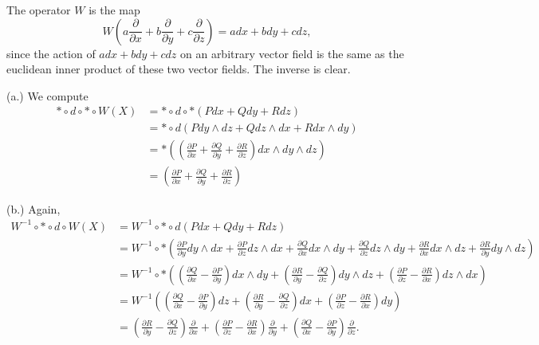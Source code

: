\documentclass[11pt, reqno]{article}
\theoremstyle{plain}
\theoremstyle{definition}
\theoremstyle{remark}
\begin{document}
\begin{enumerate}
    The operator $W$ is the map
    \[
        W(a \frac{\partial}{\partial x} + b \frac{\partial}{\partial y} + c \frac{\partial}{\partial z}) = a dx + b dy + c dz,
    \]
    since the action of $a dx + b dy + c dz$ on an arbitrary vector field is the same as the euclidean inner product of these
    two vector fields. The inverse is clear.

    (a.) We compute 
    \begin{align*}
        * \circ d \circ * \circ W(X) & = * \circ d \circ *(P dx + Q dy + R dz)\\
        &= *\circ d(P dy  \wedge dz + Q dz \wedge dx + R dx \wedge dy)\\
        &= *\left(\left(\frac{\partial P}{\partial x} + \frac{\partial Q}{\partial y} + \frac{\partial R}{\partial z}\right)dx \wedge dy \wedge dz\right)\\
        &= \left(\frac{\partial P}{\partial x} + \frac{\partial Q}{\partial y} + \frac{\partial R}{\partial z}\right)
    \end{align*}

    (b.) Again,
    \begin{align*}
        W^{-1}\circ * \circ d \circ W(X) & = W^{-1}\circ * \circ d(P dx + Q dy + Rdz)\\
        & = W^{-1}\circ *\left(\frac{\partial P}{\partial y}dy \wedge dx  +\frac{\partial P}{\partial z} dz \wedge dx 
        + \frac{\partial Q}{\partial x} dx \wedge dy + \frac{\partial Q}{\partial z} dz \wedge dy + \frac{\partial R}{\partial x} dx \wedge dz
        + \frac{\partial R}{\partial y} dy \wedge dz\right)\\
        & = W^{-1}\circ *\left(\left(\frac{\partial Q}{\partial x} - \frac{\partial P}{\partial y}\right) dx \wedge dy
        + \left(\frac{\partial R}{\partial y} - \frac{\partial Q}{\partial z}\right)dy \wedge dz
        + \left(\frac{\partial P}{\partial z} - \frac{\partial R}{\partial x}\right)dz \wedge dx\right)\\
        & = W^{-1}\left(\left(\frac{\partial Q}{\partial x} - \frac{\partial P}{\partial y}\right) dz
        + \left(\frac{\partial R}{\partial y} - \frac{\partial Q}{\partial z}\right)dx
        + \left(\frac{\partial P}{\partial z} - \frac{\partial R}{\partial x}\right)dy\right)\\
        & = \left(\frac{\partial R}{\partial y} - \frac{\partial Q}{\partial z}\right)\frac{\partial}{\partial x}
        + \left(\frac{\partial P}{\partial z} - \frac{\partial R}{\partial x}\right)\frac{\partial}{\partial y}
        + \left(\frac{\partial Q}{\partial x} - \frac{\partial P}{\partial y}\right) \frac{\partial}{\partial z}.
    \end{align*}


\end{enumerate}
\end{document}
